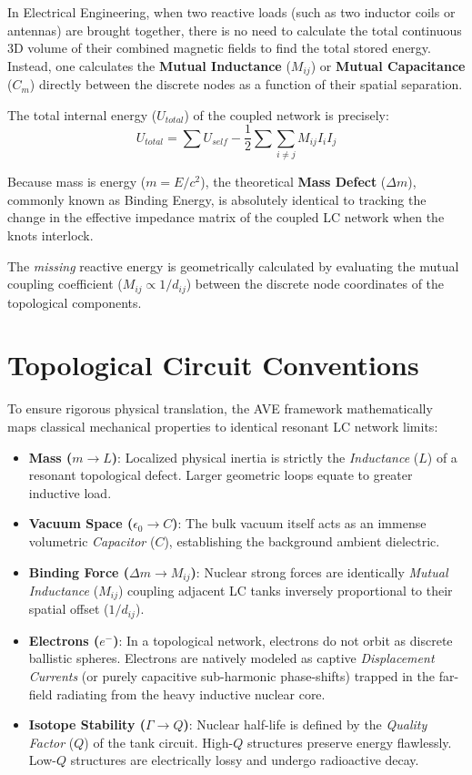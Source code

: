 In Electrical Engineering, when two reactive loads (such as two inductor coils or antennas) are brought together, there is no need to calculate the total continuous 3D volume of their combined magnetic fields to find the total stored energy. Instead, one calculates the \textbf{Mutual Inductance} ($M_{ij}$) or \textbf{Mutual Capacitance} ($C_m$) directly between the discrete nodes as a function of their spatial separation. 

The total internal energy ($U_{total}$) of the coupled network is precisely:
\begin{equation}
    U_{total} = \sum U_{self} - \frac{1}{2} \sum \sum_{i \neq j} M_{ij} I_i I_j
\end{equation}

Because mass is energy ($m = E/c^2$), the theoretical \textbf{Mass Defect} ($\Delta m$), commonly known as Binding Energy, is absolutely identical to tracking the change in the effective impedance matrix of the coupled LC network when the knots interlock. 

The \textit{missing} reactive energy is geometrically calculated by evaluating the mutual coupling coefficient ($M_{ij} \propto 1/d_{ij}$) between the discrete node coordinates of the topological components.

\section{Topological Circuit Conventions}
To ensure rigorous physical translation, the AVE framework mathematically maps classical mechanical properties to identical resonant LC network limits:
\begin{itemize}
    \item \textbf{Mass ($m \rightarrow L$)}: Localized physical inertia is strictly the \textit{Inductance} ($L$) of a resonant topological defect. Larger geometric loops equate to greater inductive load.
    \item \textbf{Vacuum Space ($\epsilon_0 \rightarrow C$)}: The bulk vacuum itself acts as an immense volumetric \textit{Capacitor} ($C$), establishing the background ambient dielectric.
    \item \textbf{Binding Force ($\Delta m \rightarrow M_{ij}$)}: Nuclear strong forces are identically \textit{Mutual Inductance} ($M_{ij}$) coupling adjacent LC tanks inversely proportional to their spatial offset ($1/d_{ij}$).
    \item \textbf{Electrons ($e^-$)}: In a topological network, electrons do not orbit as discrete ballistic spheres. Electrons are natively modeled as captive \textit{Displacement Currents} (or purely capacitive sub-harmonic phase-shifts) trapped in the far-field radiating from the heavy inductive nuclear core.
    \item \textbf{Isotope Stability ($\Gamma \rightarrow Q$)}: Nuclear half-life is defined by the \textit{Quality Factor} ($Q$) of the tank circuit. High-$Q$ structures preserve energy flawlessly. Low-$Q$ structures are electrically lossy and undergo radioactive decay.
\end{itemize}

